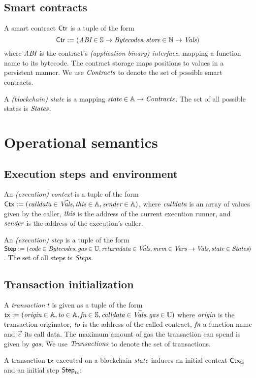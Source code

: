 \documentclass[12pt]{extarticle}
\begin{document}
\subsection{Smart contracts}
A smart contract $\mathsf{Ctr}$ is a tuple of the form $$\mathsf{Ctr}:=(\textit{ABI}\in \mathbb{S}\to \textit{Bytecodes}, \textit{store}\in \mathbb{N}\to \textit{Vals})$$ where $\textit{ABI}$ is the contract's \emph{(application binary) interface}, mapping a function name to its bytecode. The contract storage maps positions to values in a persistent manner. We use $\textit{Contracts}$ to denote the set of possible smart contracts.

A \emph{(blockchain) state} is a mapping $\textit{state}\in \mathbb{A}\to\textit{Contracts}$. The set of all possible states is $\textit{States}$.

\section{Operational semantics}

\subsection{Execution steps and environment}

An \emph{(execution) context} is a tuple of the form $\mathsf{Ctx}:=(\textit{calldata}\in\vec{\textit{Vals}},\textit{this}\in\mathbb{A},\textit{sender}\in\mathbb{A})$, 
where $\textit{calldata}$ is an array of values given by the caller, $\textit{this}$ is the address of the current execution runner, 
and $\textit{sender}$ is the address of the execution's caller. 

An \emph{(execution) step} is a tuple of the form
$\mathsf{Step}:=(
    \textit{code}\in\textit{Bytecodes},
    \textit{gas}\in\mathbb{U},
    \textit{returndata}\in\vec{\textit{Vals}}, 
    \textit{mem}\in\textit{Vars}\to\textit{Vals}, 
    \textit{state}\in\textit{States}
)$. The set of all steps is $\textit{Steps}$.

\subsection{Transaction initialization}
A \emph{transaction} $t$ is given as a tuple of the form $\mathsf{tx}:=(\textit{origin}\in\mathbb{A},\textit{to}\in\mathbb{A},\textit{fn}\in\mathbb{S},\textit{calldata}\in\vec {\textit{Vals}}, \textit{gas}\in\mathbb{U})$ where $\textit{origin}$ is the transaction originator, $\textit{to}$ is the address of the called contract, $\textit{fn}$ a function name and $\vec c$ its call data. The maximum amount of gas the transaction can spend is given by $\textit{gas}$.
We use $\textit{Transactions}$ to denote the set of transactions.

A transaction $\mathsf{tx}$ executed on a blockchain $\textit{state}$ induces an initial context $\mathsf{Ctx}_{\mathsf{tx}}$ and an initial step $\mathsf{Step}_{\mathsf{tx}}$:
\end{document}
